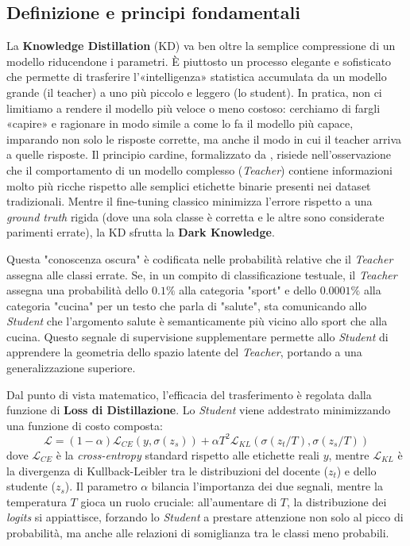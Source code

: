 \subsection{Definizione e principi fondamentali}

La \textbf{Knowledge Distillation} (KD) va ben oltre la semplice compressione di un modello riducendone i parametri. È piuttosto un processo elegante e sofisticato che permette di trasferire l’«intelligenza» statistica accumulata da un modello grande (il teacher) a uno più piccolo e leggero (lo student). In pratica, non ci limitiamo a rendere il modello più veloce o meno costoso: cerchiamo di fargli «capire» e ragionare in modo simile a come lo fa il modello più capace, imparando non solo le risposte corrette, ma anche il modo in cui il teacher arriva a quelle risposte. Il principio cardine, formalizzato da \citet{hinton2015distilling}, risiede nell'osservazione che il comportamento di un modello complesso (\textit{Teacher}) contiene informazioni molto più ricche rispetto alle semplici etichette binarie presenti nei dataset tradizionali. Mentre il fine-tuning classico minimizza l'errore rispetto a una \textit{ground truth} rigida (dove una sola classe è corretta e le altre sono considerate parimenti errate), la KD sfrutta la \textbf{Dark Knowledge}.

Questa "conoscenza oscura" è codificata nelle probabilità relative che il \textit{Teacher} assegna alle classi errate. Se, in un compito di classificazione testuale, il \textit{Teacher} assegna una probabilità dello $0.1\%$ alla categoria "sport" e dello $0.0001\%$ alla categoria "cucina" per un testo che parla di "salute", sta comunicando allo \textit{Student} che l'argomento salute è semanticamente più vicino allo sport che alla cucina. Questo segnale di supervisione supplementare permette allo \textit{Student} di apprendere la geometria dello spazio latente del \textit{Teacher}, portando a una generalizzazione superiore.

Dal punto di vista matematico, l'efficacia del trasferimento è regolata dalla funzione di \textbf{Loss di Distillazione}. Lo \textit{Student} viene addestrato minimizzando una funzione di costo composta:
\begin{equation}
    \mathcal{L} = (1 - \alpha) \mathcal{L}_{CE}(y, \sigma(z_s)) + \alpha T^2 \mathcal{L}_{KL}(\sigma(z_t/T), \sigma(z_s/T))
\end{equation}
dove $\mathcal{L}_{CE}$ è la \textit{cross-entropy} standard rispetto alle etichette reali $y$, mentre $\mathcal{L}_{KL}$ è la divergenza di Kullback-Leibler tra le distribuzioni del docente ($z_t$) e dello studente ($z_s$). Il parametro $\alpha$ bilancia l'importanza dei due segnali, mentre la temperatura $T$ gioca un ruolo cruciale: all'aumentare di $T$, la distribuzione dei \textit{logits} si appiattisce, forzando lo \textit{Student} a prestare attenzione non solo al picco di probabilità, ma anche alle relazioni di somiglianza tra le classi meno probabili.

